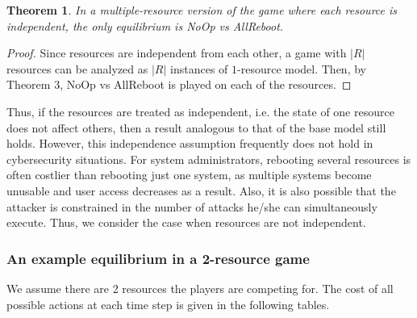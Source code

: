 \documentclass[11pt]{article}
\theoremstyle{plain}
\newtheorem{theorem}{Theorem}
\begin{document}
\begin{theorem} In a multiple-resource version of the game where each resource is independent, the only equilibrium is NoOp vs AllReboot.
\end{theorem}
\begin{proof}
Since resources are independent from each other, a game with $|R|$ resources can be analyzed as $|R|$ instances of $1$-resource model. Then, by Theorem 3, NoOp vs AllReboot is played on each of the resources.
\end{proof}
Thus, if the resources are treated as independent, i.e. the state of one resource does not affect others, then a result analogous to that of the base model still holds. However, this independence assumption frequently does not hold in cybersecurity situations. For system administrators, rebooting several resources is often costlier than rebooting just one system, as multiple systems become unusable and user access decreases as a result. Also, it is also possible that the attacker is constrained in the number of attacks he/she can simultaneously execute. Thus, we consider the case when resources are not independent.

\subsubsection{An example equilibrium in a 2-resource game}
We assume there are 2 resources the players are competing for. The cost of all possible actions at each time step is given in the following tables.
\end{document}
